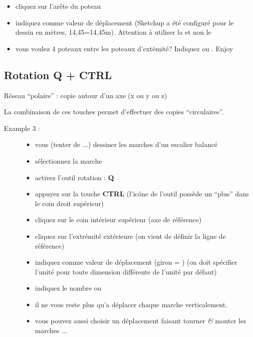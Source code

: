 \documentclass[a4paper,12pt,french]{sphinxmanual}
\begin{document}
\begin{description}
\begin{itemize}
\item {} 
cliquez sur l'arête du poteau

\item {} 
indiquez comme valeur de déplacement  (Sketchup a été configuré pour le dessin en mètres, 14,45=14,45m). Attention à utiliser la \sphinxcode{,} et non le 

\item {} 
vous voulez 4 poteaux entre les poteaux d'extémité? Indiquez  ou . Enjoy

\end{itemize}

\end{description}


\subsection{Rotation Q + CTRL}
\label{su/clonage:rotation-q-ctrl}
Réseau ``polaire'' : copie autour d'un axe (x ou y ou z)

La combinaison de ces touches permet d'effectuer des copies ``circulaires''.
\begin{description}
\item[{Example 3 :}] \leavevmode\begin{itemize}
\item {} 
vous (tenter de ...) dessiner les marches d'un escalier balancé

\item {} 
sélectionnez la marche

\item {} 
activez l'outil rotation : \textbf{Q}

\item {} 
appuyez sur la touche \textbf{CTRL} (l'icône de l'outil possède un ``plus'' dans le coin droit supérieur)

\item {} 
cliquez sur le coin intérieur supérieur (axe de référence)

\item {} 
cliquez sur l'extrémité extérieure (on vient de définir la ligne de référence)

\item {} 
indiquez comme valeur de déplacement (giron = ) \sphinxcode{22cm} (on doit spécifier l'unité pour toute dimension différente de l'unité par défaut)

\item {} 
indiquez le nombre  ou 

\item {} 
il ne vous reste plus qu'a déplacer chaque marche verticalement.

\item {} 
vous pouvez aussi choisir un déplacement faisant tourner \emph{\&} monter les marches ...

\end{itemize}

\end{description}
\end{document}
